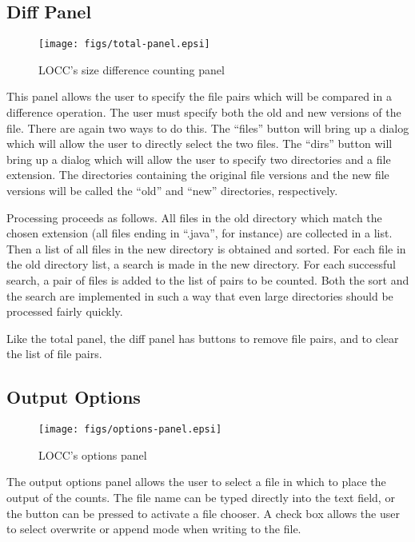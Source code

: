 \subsection{Diff Panel}

\begin{figure}
  \texttt{[image: figs/total-panel.epsi]}
  \caption{LOCC's size difference counting panel}
  \label{fig:diff-panel}
\end{figure}

This panel allows the user to specify the file pairs which will be
compared in a difference operation.  The user must specify both the old
and new versions of the file.  There are again two ways to do this.
The ``files'' button will bring up a dialog which will allow the user
to directly select the two files.  The ``dirs'' button will bring up a 
dialog which will allow the user to specify two directories and a file 
extension.  The directories containing the original file versions and
the new file versions will be called the ``old'' and ``new''
directories, respectively. 

Processing proceeds as follows.  All files in the old directory which
match the chosen extension (all files ending in ``.java'', for
instance) are collected in a list.  Then a list of all files in the
new directory is obtained and sorted.  For each file in the old
directory list, a search is made in the new directory.  For each
successful search, a pair of files is added to the list of pairs to be 
counted.  Both the sort and the search are implemented in such a way
that even large directories should be processed fairly quickly.

Like the total panel, the diff panel has buttons to remove file pairs, 
and to clear the list of file pairs.

\subsection{Output Options}

\begin{figure}
  \texttt{[image: figs/options-panel.epsi]}
  \caption{LOCC's options panel}
  \label{fig:options-panel}
\end{figure}

The output options panel allows the user to select a file in which to
place the output of the counts.  The file name can be typed directly
into the text field, or the button can be pressed to activate a file
chooser.  A check box allows the user to select overwrite or append
mode when writing to the file.


